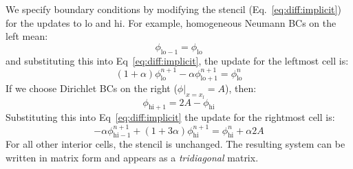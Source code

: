 We specify boundary conditions by modifying the stencil
(Eq.~\ref{eq:diff:implicit}) for the updates to $\mathrm{lo}$ and
$\mathrm{hi}$.  For example, homogeneous Neumann BCs on the left mean:
\begin{equation}
\phi_\mathrm{lo-1} = \phi_\mathrm{lo}
\end{equation}
and substituting this into Eq~\ref{eq:diff:implicit}, the update for the leftmost cell is:
\begin{equation}
 (1 + \alpha) \phi_\mathrm{lo}^{n+1} -\alpha \phi_\mathrm{lo+1}^{n+1}  = 
  \phi_\mathrm{lo}^n
\end{equation}
If we choose Dirichlet BCs on the right ($\phi |_{x=x_l} = A$), then:
\begin{equation}
\phi_\mathrm{hi+1} = 2 A - \phi_\mathrm{hi}
\end{equation}
Substituting this into Eq~\ref{eq:diff:implicit} the update for the rightmost cell is:
\begin{equation}
- \alpha \phi_\mathrm{hi-1}^{n+1} + (1 + 3\alpha) \phi_\mathrm{hi}^{n+1}  =
  \phi_\mathrm{hi}^n + \alpha 2 A
\end{equation}
For all other interior cells, the stencil is unchanged.  The resulting
system can be written in matrix form and appears as a {\em tridiagonal}
matrix.  
